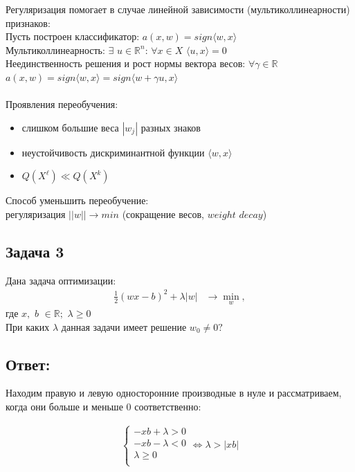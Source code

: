 Регуляризация помогает в случае линейной зависимости (мультиколлинеарности) признаков:\\
Пусть построен классификатор: $a(x, w) = sign\langle w, x \rangle$ \\
Мультиколлинеарность: $\exists$  $u \in \mathbb{R}^{n}$: $\forall x \in X$ $\langle u, x \rangle = 0$ \\
Неединственность решения и рост нормы вектора весов: $\forall \gamma \in \mathbb{R}$ $a(x, w) = sign\langle w, x \rangle = sign \langle w + \gamma u, x \rangle$ \\
\\
Проявления переобучения:
\begin{itemize}
    \item слишком большие веса $|w_j|$ разных знаков
    \item неустойчивость дискриминантной функции $\langle w, x \rangle$
    \item $Q(X^{\ell}) \ll Q(X^{k})$
\end{itemize}
Способ уменьшить переобучение:\\
регуляризация $||w|| \rightarrow min$ (сокращение весов, $weight$ $decay$)

\subsection{Задача 3}

Дана задача оптимизации:
\begin{align*}
    \frac{1}{2}(wx - b)^2 + \lambda|w| & \rightarrow \min_{w},
\end{align*}
где $x,$ $b$ $\in \mathbb{R};$ $\lambda \geq 0$\\
При каких $\lambda$ данная задачи имеет решение $w_0 \neq 0?$
 
\subsection{Ответ:}

Находим правую и левую односторонние производные в нуле и рассматриваем, когда они больше и меньше 0 соответственно:

\begin{align*}
    \begin{cases}
        -xb + \lambda > 0\\
        -xb - \lambda < 0\\
        \lambda \geq 0\\
    \end{cases} \Leftrightarrow \lambda > |xb|
\end{align*}

